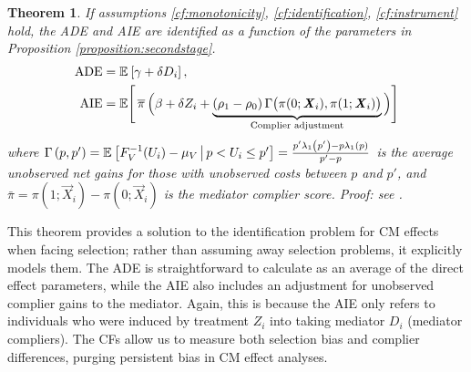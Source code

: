 \newtheorem{theoremCF}{Theorem}
\renewcommand\thetheoremCF{CF}
\begin{theoremCF}
    \label{thm:cf-identification}
    If assumptions \ref{cf:monotonicity}, \ref{cf:identification}, \ref{cf:instrument} hold, the ADE and AIE are identified as a function of the parameters in Proposition \ref{proposition:secondstage}.
    \begin{align*}
    \text{ADE}
        &= \mathbb{E}_{} \left[ \gamma + \delta D_i \right], \\
    \text{AIE}
        &= \mathbb E \Bigg[ \, \overline{\pi} \,
            \Big( \beta +  \delta Z_i +
                \underbrace{ (\rho_1 - \rho_0) \,
                \Gamma \big(\pi(0; \boldsymbol{\mathit{X}}_i), \pi(1; \boldsymbol{\mathit{X}}_i) \big)}_{
                    \text{Complier adjustment}} \Big) \Bigg]
    \end{align*}
    where $\Gamma\left(p,p'\right) 
    = \mathbb{E}_{} \left[  F^{-1}_V(U_i) - \mu_V \, \middle\vert \, p < U_i \leq p' \right]
    = \frac{p'\lambda_1\left(p'\right) - p\lambda_1\left(p\right)}{p' - p}$ is the average unobserved net gains for those with unobserved costs between $p$ and $p'$, and $\bar\pi = \pi(1; \vec X_i) - \pi(0; \vec X_i)$ is the mediator complier score.
    Proof: see .
\end{theoremCF}

This theorem provides a solution to the identification problem for CM effects when facing selection;
rather than assuming away selection problems, it explicitly models them.
The ADE is straightforward to calculate as an average of the direct effect parameters, while the AIE also includes an adjustment for unobserved complier gains to the mediator.
Again, this is because the AIE only refers to individuals who were induced by treatment $Z_i$ into taking mediator $D_i$ (mediator compliers).
The CFs allow us to measure both selection bias and complier differences, purging persistent bias in CM effect analyses.

